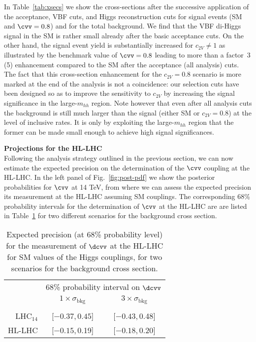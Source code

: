 In Table~\ref{tab:xsecs} we show the cross-sections after the
successive application of the acceptance, VBF cuts, and Higgs reconstruction cuts
for signal events (SM and  $\cvv=0.8$) and for
the total background. We find that the VBF di-Higgs signal in the SM is rather small
already after the basic acceptance cuts. On the other hand, the signal event
yield is substantially increased for $c_{2V}\ne 1$ as illustrated by the
benchmark value of $\cvv = 0.8$ leading to more than a factor~3\,(5) enhancement
compared to the SM after the acceptance (all analysis) cuts. The fact that this
cross-section enhancement for the $c_{2V} = 0.8$ scenario is more marked at the
end of the analysis is not a coincidence: our selection cuts have been designed
so as to improve the sensitivity to $c_{2V}$ by increasing the signal
significance in the large-$m_{hh}$ region.
Note however that even after
all analysis cuts the background is still much larger than the signal (either SM
or $c_{2V}=0.8$) at the level of inclusive rates. It is only by exploiting  the
large-$m_{hh}$ region that the former can be made small enough to achieve high
signal significances.

\noindent
{\bf Projections for the HL-LHC}\\
Following the analysis strategy outlined in the previous section,
we can now estimate the expected precision on the 
determination of the $\cvv$ coupling at the HL-LHC.
%
In the left panel of Fig.~\ref{fig:post-pdf} we show the
posterior probabilities for $\cvv$ at 14 TeV,
from where we can assess the expected precision  
       its measurement at the HL-LHC assuming SM couplings.
The corresponding 68\% probability intervals for the determination of $\cvv$ at the HL-LHC 
are are listed in Table~\ref{tab:resultsdcvv} for two different 
scenarios for the background cross section.
\begin{table}[h!]
\begin{center}
  \begin{tabular}{r|@{\hskip 0.15in}c @{\hskip 0.2in}c}
  	\toprule[1pt]
  	&\multicolumn{2}{c}{68\% probability interval on $\dcvv$}\\[0.1cm]
    & $1\times\sigma_\text{bkg}$&
    $3\times\sigma_\text{bkg}$ \\[0.1cm]
\hline
 & & \\[-0.3cm]
LHC$_{14}$ & [$-0.37$,\,$0.45$] & [$-0.43$,\,0.48] \\[0.2cm]
HL-LHC & [$-0.15$,\,0.19] & [$-0.18$,\,0.20]\\[0.2cm]
\bottomrule[1pt]
\end{tabular}
\end{center}
\vspace{-0.3cm}
\caption{\small Expected precision (at 68\% probability level) for
  the measurement of $\dcvv$ at the HL-LHC for
  SM values of the Higgs couplings, for two scenarios for the background cross section.
  \label{tab:resultsdcvv}
}
\end{table}

